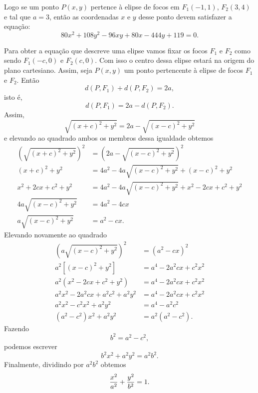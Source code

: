 \begin{exemplo}
\begin{solucao}
        Logo se um ponto $P(x,y)$ pertence à elipse de focos em $F_1(-1, 1)$, $F_2(3,4)$ e tal que $a = 3$, então as coordenadas $x$ e $y$ desse ponto devem
        satisfazer a equação:
        \[
            80x^2 + 108y^2 - 96xy + 80x - 444y + 119 = 0.
        \]
    \end{solucao}

\end{exemplo}
Para obter a equação que descreve uma elipse vamos fixar os focos $F_1$ e $F_2$ como sendo $F_1(-c,0)$ e $F_2(c,0)$. Com isso o centro dessa elipse estará na
origem do plano cartesiano. Assim, seja $P(x,y)$ um ponto pertencente à elipse de focos $F_1$ e $F_2$. Então
\begin{equation}
    d(P,F_1) + d(P,F_2) = 2a,
\end{equation}
isto é,
\begin{equation}
    d(P,F_1) = 2a -  d(P,F_2).
\end{equation}
Assim,
\[
    \sqrt{(x + c)^2 + y^2} = 2a - \sqrt{(x - c)^2 + y^2}
\]
e elevando ao quadrado ambos os membros dessa igualdade obtemos
\begin{align*}
    (\sqrt{(x + c)^2 + y^2})^2 & = (2a - \sqrt{(x - c)^2 + y^2})^2                         \\
    (x + c)^2 + y^2            & = 4a^2 - 4a\sqrt{(x - c)^2 + y^2} + (x - c)^2 + y^2       \\
    x^2 + 2cx + c^2 + y^2      & = 4a^2 - 4a\sqrt{(x - c)^2 + y^2} + x^2 - 2cx + c^2 + y^2 \\
    4a\sqrt{(x - c)^2 + y^2}   & = 4a^2 - 4cx                                              \\
    a\sqrt{(x - c)^2 + y^2}    & = a^2 - cx.
\end{align*}
Elevando novamente ao quadrado
\begin{align*}
    (a\sqrt{(x - c)^2 + y^2})^2       & = (a^2 - cx)^2          \\
    a^2[(x - c)^2 + y^2]              & = a^4 - 2a^2cx + c^2x^2 \\
    a^2(x^2 - 2cx + c^2 + y^2)        & = a^4 - 2a^2cx + c^2x^2 \\
    a^2x^2 - 2a^2cx + a^2c^2 + a^2y^2 & = a^4 - 2a^2cx + c^2x^2 \\
    a^2x^2 - c^2x^2 + a^2y^2          & = a^4 - a^2c^2          \\
    (a^2 - c^2)x^2 + a^2y^2           & = a^2(a^2 - c^2).
\end{align*}
Fazendo
\begin{equation}\label{relacaoauxiliarelipse}
    b^2 = a^2 - c^2,
\end{equation}
podemos escrever
\[
    b^2x^2 + a^2y^2 = a^2b^2.
\]
Finalmente, dividindo por $a^2b^2$ obtemos
\begin{equation}\label{equacaoelipse}
    \dfrac{x^2}{a^2} + \dfrac{y^2}{b^2} = 1.
\end{equation}

